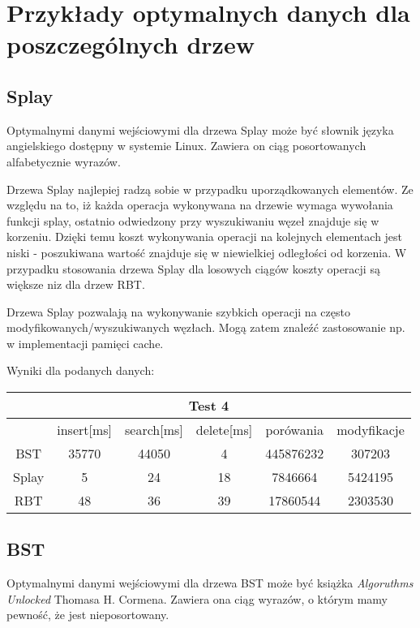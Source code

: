 \documentclass[titlepage]{article}
\begin{document}
\section{Przykłady optymalnych danych dla poszczególnych drzew}
\subsection{Splay}
Optymalnymi danymi wejściowymi dla drzewa Splay może być słownik języka angielskiego dostępny w systemie Linux. Zawiera on ciąg posortowanych alfabetycznie wyrazów. 

Drzewa Splay najlepiej radzą sobie w przypadku uporządkowanych elementów. Ze względu na to, iż każda operacja wykonywana na drzewie wymaga wywołania funkcji splay, ostatnio odwiedzony przy wyszukiwaniu węzeł znajduje się w korzeniu. Dzięki temu koszt wykonywania operacji na kolejnych elementach jest niski - poszukiwana wartość znajduje się w niewielkiej odległości od korzenia. W przypadku stosowania drzewa Splay dla losowych ciągów koszty operacji są większe niz dla drzew RBT.

Drzewa Splay pozwalają na wykonywanie szybkich operacji na często modyfikowanych/wyszukiwanych węzłach.
Mogą zatem znaleźć zastosowanie np. w implementacji pamięci cache.

Wyniki dla podanych danych: 
\begin{table}[h!]
	\centering
    \label{tab:table4}
    \begin{tabular}{|c|c|c|c|c|c|}
    		\multicolumn{6}{c}{Test 4}\\
    		\hline
      	& insert[ms] & search[ms] & delete[ms] & porówania & modyfikacje\\
      	\hline
      	BST & 35770 & 44050 & 4 & 445876232 & 307203\\
      	\hline
      	Splay & 5 & 24 & 18 & 7846664 & 5424195\\
      	\hline
      	RBT & 48 & 36 & 39 & 17860544 & 2303530\\
		\hline
    \end{tabular}
\end{table}

\pagebreak
\subsection{BST}
Optymalnymi danymi wejściowymi dla drzewa BST może być książka \textit{Algoruthms Unlocked} Thomasa H. Cormena. Zawiera ona ciąg wyrazów, o którym mamy pewność, że jest nieposortowany.
\end{document}
